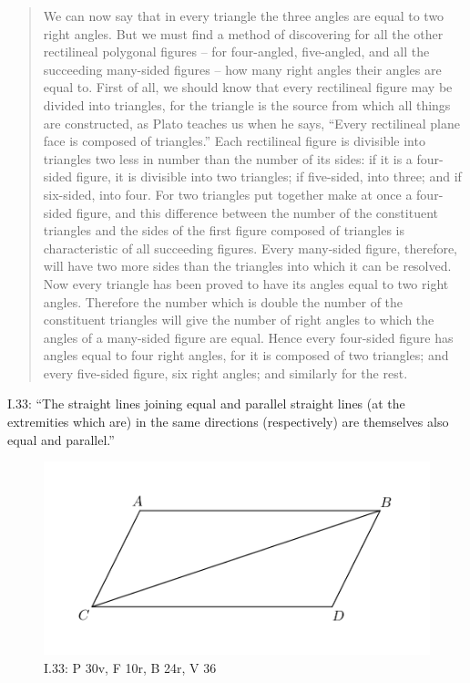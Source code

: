 \documentclass{article}
\begin{document}
\begin{quote}
We can now say that in 
every triangle the three angles are equal to two right angles. 
But we must find a method of discovering for all the other
rectilineal polygonal figures -- for four-angled, five-angled,
and all the succeeding many-sided figures -- how many right
angles their angles are equal to. First of all, we should know
that every rectilineal figure may be divided into triangles, for
the triangle is the source from which all things are constructed,
as Plato teaches us when he says, ``Every rectilineal plane
face is composed of triangles.'' Each rectilineal figure is
divisible into triangles two less in number than the number of
its sides: if it is a four-sided figure, it is divisible into two
triangles; if five-sided, into three; and if six-sided, into four.
For two triangles put together make at once a four-sided
figure, and this difference between the number of the
constituent triangles and the sides of the first figure
composed of triangles is characteristic of all succeeding figures.
Every many-sided figure, therefore, will have two more
sides than the triangles into which it can be resolved. Now
every triangle has been proved to have its angles equal to
two right angles. Therefore the number which is double the
number of the constituent triangles will give the number of
right angles to which the angles of a many-sided figure are
equal. Hence every four-sided figure has angles equal to four
right angles, for it is composed of two triangles; and every
five-sided figure, six right angles; and similarly for the rest.
\end{quote}





I.33: ``The straight lines joining equal and parallel straight
lines (at the extremities which are) in the same directions
(respectively) are themselves also equal and parallel.''

\begin{figure}
\begin{center}
\includegraphics{I33.png}
\end{center}
\caption{I.33: P 30v, F 10r, B 24r, V 36}
\label{I33}
\end{figure}
\end{document}
